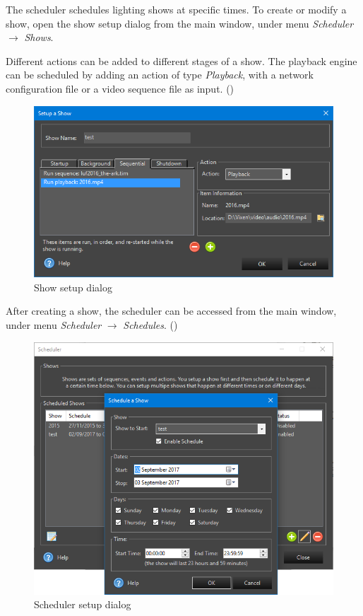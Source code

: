 The scheduler schedules lighting shows at specific times. To create or modify a show, open the show setup dialog from the main window, under menu \textit{Scheduler} $\rightarrow$ \textit{Shows}.

Different actions can be added to different stages of a show. The  playback engine can be scheduled by adding an action of type \textit{Playback}, with a network configuration file or a video sequence file as input. ()

\begin{figure}[!htb]
  \centering
  \includegraphics[width=0.8\columnwidth]{Figs/vixen_show.png}
  \caption{\footnotesize Show setup dialog}
  \label{fig:guide_show}
\end{figure}

After creating a show, the scheduler can be accessed from the main window, under menu \textit{Scheduler} $\rightarrow$ \textit{Schedules}. ()

\begin{figure}[!htb]
  \centering
  \includegraphics[width=0.75\columnwidth]{Figs/vixen_scheduler.png}
  \caption{\footnotesize Scheduler setup dialog}
  \label{fig:guide_scheduler}
\end{figure}

